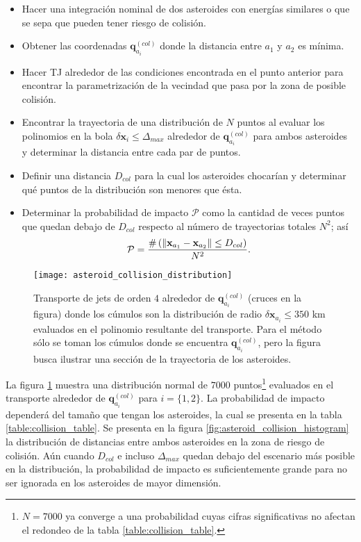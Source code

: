 \begin{itemize}
 \item Hacer una integración nominal de dos asteroides con energías similares o que se sepa que pueden tener riesgo de colisión.
 
 \item Obtener las coordenadas $\mathbf{q}_{a_i}^{(col)}$ donde la distancia entre $a_1$ y $a_2$ es mínima.
 
 \item Hacer TJ alrededor de las condiciones encontrada en el punto anterior para encontrar la parametrización de la vecindad que pasa por la zona de posible colisión.
 
 \item Encontrar la trayectoria de una distribución de $N$ puntos al evaluar los polinomios en la bola $\delta\mathbf{x}_i \leq \Delta_{max}$ alrededor de $\mathbf{q}_{a_i}^{(col)}$ para ambos asteroides y determinar la distancia entre cada par de puntos.
 
 \item Definir una distancia $D_{col}$ para la cual los asteroides chocarían y determinar qué puntos de la distribución son menores que ésta.
 
 \item Determinar la probabilidad de impacto $\mathcal{P}$ como la cantidad de veces puntos que quedan debajo de $D_{col}$ respecto al número de trayectorias totales $N^2$; así
 \begin{equation} 
 \mathcal{P} = \frac{ \# \left( \left\lVert\mathbf{x}_{a_1} - \mathbf{x}_{a_2} \right\rVert    \leq D_{col} \right) }{N^2}.
 \end{equation}
\end{itemize}

\begin{figure}
 \centering
 \texttt{[image: asteroid\_collision\_distribution]}
 \caption{Transporte de jets de orden $4$ alrededor de $\mathbf{q}_{a_i}^{(col)}$ (cruces en la figura) donde los cúmulos son la distribución de radio $\delta\mathbf{x}_{a_i} \leq 350$ km evaluados en el polinomio resultante del transporte. Para el método sólo se toman los cúmulos donde se encuentra $\mathbf{q}_{a_i}^{(col)}$, pero la figura busca ilustrar una sección de la trayectoria de los asteroides.}
 \label{fig:asteroid_collision_distribution}
\end{figure}

La figura \ref{fig:asteroid_collision_distribution} muestra una distribución normal de $7000$ puntos\footnote{$ N = 7000$ ya converge a una probabilidad cuyas cifras significativas no afectan el redondeo de la tabla \ref{table:collision_table}.} evaluados en el transporte alrededor de $\mathbf{q}_{a_i}^{(col)}$ para $i = \{1,2\}$. La probabilidad de impacto dependerá del tamaño que tengan los asteroides, la cual se presenta en la tabla \ref{table:collision_table}. Se presenta en la figura \ref{fig:asteroid_collision_histogram} la distribución de distancias entre ambos asteroides en la zona de riesgo de colisión. Aún cuando $D_{col}$ e incluso $\Delta_{max}$ quedan debajo del escenario más posible en la distribución, la probabilidad de impacto es suficientemente grande para no ser ignorada en los asteroides de mayor dimensión.

